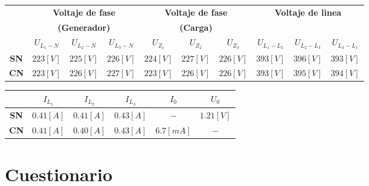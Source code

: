 \documentclass[letter,11pt]{article}
\begin{document}
\begin{center}
    \begin{tabular}{|c||c|c|c||c|c|c||c|c|c|}
    \hline
    & \multicolumn{3}{c||}{\textbf{Voltaje de fase}} & \multicolumn{3}{c||}{\textbf{Voltaje de fase}} & \multicolumn{3}{c|}{\textbf{Voltaje de linea}}
    \tabularnewline
    & \multicolumn{3}{c||}{\textbf{(Generador)}} & \multicolumn{3}{c||}{\textbf{(Carga)}} & \multicolumn{3}{c|}{}
    \tabularnewline \hline
    & $U_{L_1-N}$ & $U_{L_2-N}$ & $U_{L_3-N}$ & $U_{Z_1}$ & $U_{Z_2}$ & $U_{Z_3}$ & $U_{L_1-L_2}$ & $U_{L_2-L_3}$ & $U_{L_3-L_1}$
    \tabularnewline \hline \hline
    \textbf{SN} & $223[V]$ & $225[V]$ & $226[V]$ & $224[V]$ & $227[V]$ & $226[V]$ & $393[V]$ & $396[V]$ & $393[V]$
    \tabularnewline \hline
    \textbf{CN} & $223[V]$ & $226[V]$ & $227[V]$ & $223[V]$ & $226[V]$ & $226[V]$ & $393[V]$ & $395[V]$ & $394[V]$
    \tabularnewline \hline
    \end{tabular}
\end{center}

\begin{center}
    \begin{tabular}{|c||c|c|c||c|c|}
    \hline
    & $I_{L_1}$ & $I_{L_2}$ & $I_{L_3}$ & $I_0$ & $U_0$
    \tabularnewline \hline \hline
    \textbf{SN} & $0.41[A]$ & $0.41[A]$ & $0.43[A]$ & $-$ & $1.21[V]$
    \tabularnewline \hline
    \textbf{CN} & $0.41[A]$ & $0.40[A]$ & $0.43[A]$ & $6.7[mA]$ & $-$
    \tabularnewline \hline
    \end{tabular}
\end{center}

\section{Cuestionario}
\end{document}
